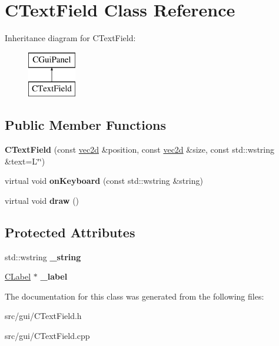 \hypertarget{class_c_text_field}{
\section{CTextField Class Reference}
\label{class_c_text_field}
}
Inheritance diagram for CTextField:\begin{figure}[H]
\begin{center}
\leavevmode
\includegraphics[height=2.000000cm]{class_c_text_field}
\end{center}
\end{figure}
\subsection*{Public Member Functions}
\begin{DoxyCompactItemize}
\item 
\hypertarget{class_c_text_field_a8a1d91c6f80ba3a98cfde80681705d74}{
{\bfseries CTextField} (const \hyperlink{classvec2d}{vec2d} \&position, const \hyperlink{classvec2d}{vec2d} \&size, const std::wstring \&text=L\char`\"{}\char`\"{})}
\label{class_c_text_field_a8a1d91c6f80ba3a98cfde80681705d74}

\item 
\hypertarget{class_c_text_field_aad1383591067e3ec981356e98e690dee}{
virtual void {\bfseries onKeyboard} (const std::wstring \&string)}
\label{class_c_text_field_aad1383591067e3ec981356e98e690dee}

\item 
\hypertarget{class_c_text_field_a7809dd12c6f601f6f52a39e1b8f36ff5}{
virtual void {\bfseries draw} ()}
\label{class_c_text_field_a7809dd12c6f601f6f52a39e1b8f36ff5}

\end{DoxyCompactItemize}
\subsection*{Protected Attributes}
\begin{DoxyCompactItemize}
\item 
\hypertarget{class_c_text_field_a26bd78e5a1a4609dbaae13f40cd1a5e1}{
std::wstring {\bfseries \_\-string}}
\label{class_c_text_field_a26bd78e5a1a4609dbaae13f40cd1a5e1}

\item 
\hypertarget{class_c_text_field_a8f399613b03fbf9017ba7dd49f22244e}{
\hyperlink{class_c_label}{CLabel} $\ast$ {\bfseries \_\-label}}
\label{class_c_text_field_a8f399613b03fbf9017ba7dd49f22244e}

\end{DoxyCompactItemize}


The documentation for this class was generated from the following files:\begin{DoxyCompactItemize}
\item 
src/gui/CTextField.h\item 
src/gui/CTextField.cpp\end{DoxyCompactItemize}
